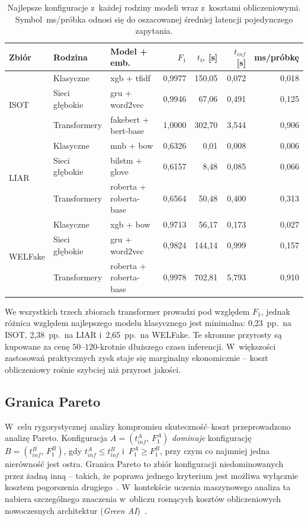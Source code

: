 \documentclass[oneside,polski,logo]{amuthesis}
\begin{document}
\begin{table}[ht]
\centering
\caption{Najlepsze konfiguracje z~każdej rodziny modeli wraz
z~kosztami obliczeniowymi. Symbol \,ms/próbka odnosi się do
oszacowanej średniej latencji pojedynczego zapytania.}
\label{tab:kompromis_best}
\small
\setlength{\tabcolsep}{4pt}
\begin{tabular}{@{}lllrrrr@{}}
\toprule
Zbiór & Rodzina & Model + emb. & $F_1$ & $t_{tr}$ [s] & $t_{inf}$ [s] & ms/próbkę \\
\midrule
\multirow{3}{*}{ISOT}
 & Klasyczne     & xgb + tfidf            & 0,9977 & 150,05 & 0,072  & 0,018 \\
 & Sieci głębokie & gru + word2vec        & 0,9946 & 67,06  & 0,491  & 0,125 \\
 & Transformery  & fakebert + bert-base   & 1,0000 & 302,70 & 3,544  & 0,906 \\
\midrule
\multirow{3}{*}{LIAR}
 & Klasyczne     & mnb + bow              & 0,6326 & 0,01   & 0,008  & 0,006 \\
 & Sieci głębokie & bilstm + glove        & 0,6157 & 8,48   & 0,085  & 0,066 \\
 & Transformery  & roberta + roberta-base & 0,6564 & 50,48  & 0,400  & 0,313 \\
\midrule
\multirow{3}{*}{WELFake}
 & Klasyczne     & xgb + bow              & 0,9713 & 56,17  & 0,173  & 0,027 \\
 & Sieci głębokie & gru + word2vec        & 0,9824 & 144,14 & 0,999  & 0,157 \\
 & Transformery  & roberta + roberta-base & 0,9978 & 702,81 & 5,793  & 0,910 \\
\bottomrule
\end{tabular}
\end{table}

We wszystkich trzech zbiorach transformer prowadzi pod względem $F_1$,
jednak różnica względem najlepszego modelu klasycznego jest minimalna:
0{,}23~pp.\ na ISOT, 2{,}38~pp.\ na LIAR i~2{,}65~pp.\ na WELFake.
Te skromne przyrosty są kupowane za cenę \(50\)--\(120\)-krotnie
dłuższego czasu inferencji. W~większości zastosowań praktycznych
zysk staje się marginalny ekonomicznie -- koszt obliczeniowy rośnie
szybciej niż przyrost jakości.

\subsection{Granica Pareto}
\label{sec:kompromis_pareto}

W~celu rygorystycznej analizy kompromisu skuteczność--koszt
przeprowadzono analizę Pareto. Konfiguracja $A = (t_{inf}^A,\,F_1^A)$
\emph{dominuje} konfigurację $B = (t_{inf}^B,\,F_1^B)$, gdy
$t_{inf}^A \le t_{inf}^B$ i~$F_1^A \ge F_1^B$, przy czym co najmniej
jedna nierówność jest ostra. Granica Pareto to zbiór konfiguracji
niedominowanych przez żadną inną -- takich, że poprawa jednego kryterium
jest możliwa wyłącznie kosztem pogorszenia drugiego~\cite{pareto1906manuale,
miettinen1999nonlinear, deb2001multi}. W~kontekście uczenia maszynowego
analiza ta nabiera szczególnego znaczenia w~obliczu rosnących kosztów
obliczeniowych nowoczesnych architektur (\emph{Green AI})~\cite{schwartz2020green,
treviso2023efficient}.
\end{document}
